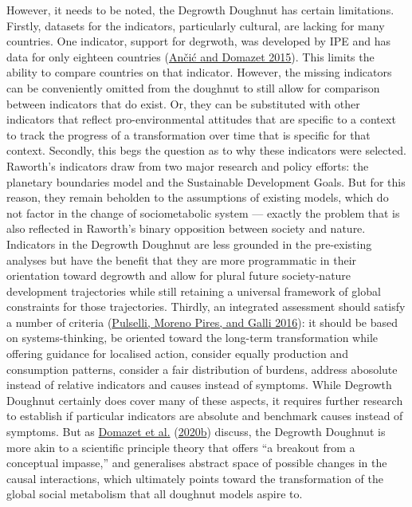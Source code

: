 \documentclass[a4paper, nobind]{templates/ociamthesis}
\begin{document}
However, it needs to be noted, the Degrowth Doughnut has certain limitations. Firstly, datasets for the indicators, particularly cultural, are lacking for many countries. One indicator, support for degrwoth, was developed by IPE and has data for only eighteen countries (\protect\hyperlink{ref-ancic_potential_2015}{Ančić and Domazet 2015}). This limits the ability to compare countries on that indicator. However, the missing indicators can be conveniently omitted from the doughnut to still allow for comparison between indicators that do exist. Or, they can be substituted with other indicators that reflect pro-environmental attitudes that are specific to a context to track the progress of a transformation over time that is specific for that context. Secondly, this begs the question as to why these indicators were selected. Raworth's indicators draw from two major research and policy efforts: the planetary boundaries model and the Sustainable Development Goals. But for this reason, they remain beholden to the assumptions of existing models, which do not factor in the change of sociometabolic system --- exactly the problem that is also reflected in Raworth's binary opposition between society and nature. Indicators in the Degrowth Doughnut are less grounded in the pre-existing analyses but have the benefit that they are more programmatic in their orientation toward degrowth and allow for plural future society-nature development trajectories while still retaining a universal framework of global constraints for those trajectories. Thirdly, an integrated assessment should satisfy a number of criteria (\protect\hyperlink{ref-pulselli_need_2016}{Pulselli, Moreno Pires, and Galli 2016}): it should be based on systems-thinking, be oriented toward the long-term transformation while offering guidance for localised action, consider equally production and consumption patterns, consider a fair distribution of burdens, address abosolute instead of relative indicators and causes instead of symptoms. While Degrowth Doughnut certainly does cover many of these aspects, it requires further research to establish if particular indicators are absolute and benchmark causes instead of symptoms. But as \protect\hyperlink{ref-domazet_mental_2020}{Domazet et al.} (\protect\hyperlink{ref-domazet_mental_2020}{2020b}) discuss, the Degrowth Doughnut is more akin to a scientific principle theory that offers ``a breakout from a conceptual impasse,'' and generalises abstract space of possible changes in the causal interactions, which ultimately points toward the transformation of the global social metabolism that all doughnut models aspire to.
\end{document}
